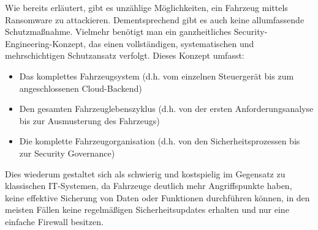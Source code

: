 Wie bereits erläutert, gibt es unzählige Möglichkeiten, ein 
Fahrzeug mittels Ransomware zu attackieren. Dementsprechend gibt es auch keine 
allumfassende Schutzmaßnahme. Vielmehr benötigt man ein 
ganzheitliches Security-Engineering-Konzept, das einen vollständigen, systematischen 
und mehrschichtigen Schutzansatz verfolgt. 
Dieses Konzept umfasst:

\begin{itemize}
    \item Das komplettes Fahrzeugsystem (d.h. vom einzelnen Steuergerät bis 
    zum angeschlossenen Cloud-Backend)
    \item Den gesamten Fahrzeuglebenszyklus (d.h. von der ersten Anforderungsanalyse 
    bis zur Ausmusterung des Fahrzeugs)
    \item Die komplette Fahrzeugorganisation (d.h. von den Sicherheitsprozessen 
    bis zur Security Governance)
\end{itemize}

Dies wiederum gestaltet sich als schwierig und kostspielig im Gegensatz zu 
klassischen IT-Systemen, da Fahrzeuge deutlich mehr Angriffspunkte haben, 
keine effektive Sicherung von Daten oder Funktionen durchführen können, in den 
meisten Fällen keine regelmäßigen Sicherheitsupdates erhalten und nur eine einfache 
Firewall besitzen.
